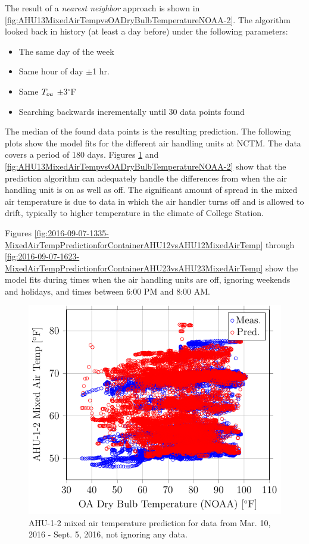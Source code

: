 The result of a \textit{nearest neighbor} approach is shown in \figref{} \ref{fig:AHU13MixedAirTempvsOADryBulbTemperatureNOAA-2}. The algorithm looked back in history (at least a day before) under the following parameters:

\begin{itemize}
    \item The same day of the week
    \item Same hour of day \(\pm\)1 hr.
    \item Same \(T_{oa}{}\) \(\pm\)3\(^\circ\)F
    \item Searching backwards incrementally until 30 data points found
\end{itemize}

The median of the found data points is the resulting prediction. The following plots show the model fits for the different air handling units at NCTM. The data covers a period of 180 days. Figures \ref{fig:2016-09-07-1218-AHU12MixedAirTempvsOADryBulbTemperatureNOAA} and \ref{fig:AHU13MixedAirTempvsOADryBulbTemperatureNOAA-2} show that the prediction algorithm can adequately handle the differences from when the air handling unit is on as well as off. The significant amount of spread in the mixed air temperature is due to data in which the air handler turns off and is allowed to drift, typically to higher temperature in the climate of College Station. 

Figures \ref{fig:2016-09-07-1335-MixedAirTempPredictionforContainerAHU12vsAHU12MixedAirTemp} through \ref{fig:2016-09-07-1623-MixedAirTempPredictionforContainerAHU23vsAHU23MixedAirTemp} show the model fits during times when the air handling units are off, ignoring weekends and holidays, and times between 6:00 PM and 8:00 AM.

\newcommand{\matcaption}[1]{#1 mixed air temperature prediction for data from Mar. 10, 2016 - Sept. 5, 2016, not ignoring any data.}

\begin{figure}
\centering
\includegraphics[]{Plots/2016-09-07-1218-AHU12MixedAirTempvsOADryBulbTemperatureNOAA.pdf}
\caption{\matcaption{AHU-1-2}}
\label{fig:2016-09-07-1218-AHU12MixedAirTempvsOADryBulbTemperatureNOAA}
\end{figure}

